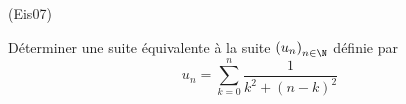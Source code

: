 \begin{tiny}(Eis07)\end{tiny} Déterminer une suite équivalente à la suite $\left( u_n\right) _{n\in \N}$ définie par
\begin{displaymath}
 u_n = \sum_{k=0}^n \frac{1}{k^2 +(n-k)^2}
\end{displaymath}
